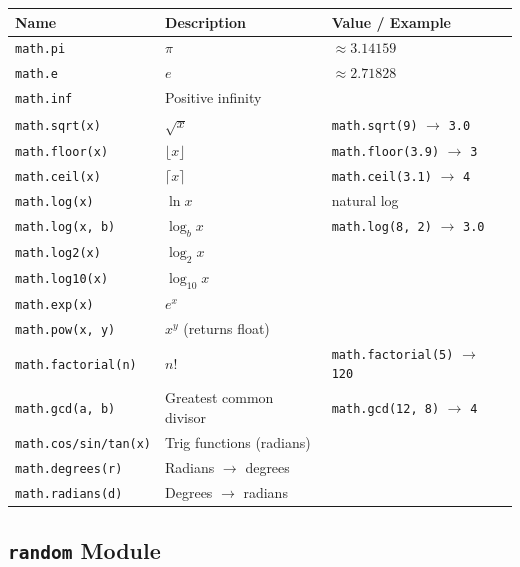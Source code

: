 \documentclass[oneside]{book}
\begin{document}
\begin{center}
\begin{tabular}{lll}
\toprule
\textbf{Name} & \textbf{Description} & \textbf{Value / Example} \\
\midrule
\texttt{math.pi}          & $\pi$                        & $\approx 3.14159$ \\
\texttt{math.e}           & $e$                          & $\approx 2.71828$ \\
\texttt{math.inf}         & Positive infinity            & \\
\texttt{math.sqrt(x)}     & $\sqrt{x}$                   & \texttt{math.sqrt(9)} $\to$ \texttt{3.0} \\
\texttt{math.floor(x)}    & $\lfloor x \rfloor$          & \texttt{math.floor(3.9)} $\to$ \texttt{3} \\
\texttt{math.ceil(x)}     & $\lceil x \rceil$            & \texttt{math.ceil(3.1)} $\to$ \texttt{4} \\
\texttt{math.log(x)}      & $\ln x$                      & natural log \\
\texttt{math.log(x, b)}   & $\log_b x$                   & \texttt{math.log(8, 2)} $\to$ \texttt{3.0} \\
\texttt{math.log2(x)}     & $\log_2 x$                   & \\
\texttt{math.log10(x)}    & $\log_{10} x$                & \\
\texttt{math.exp(x)}      & $e^x$                        & \\
\texttt{math.pow(x, y)}   & $x^y$ (returns float)        & \\
\texttt{math.factorial(n)} & $n!$                        & \texttt{math.factorial(5)} $\to$ \texttt{120} \\
\texttt{math.gcd(a, b)}   & Greatest common divisor      & \texttt{math.gcd(12, 8)} $\to$ \texttt{4} \\
\texttt{math.cos/sin/tan(x)} & Trig functions (radians)  & \\
\texttt{math.degrees(r)}  & Radians $\to$ degrees        & \\
\texttt{math.radians(d)}  & Degrees $\to$ radians        & \\
\bottomrule
\end{tabular}
\end{center}

\subsection*{\texttt{random} Module}
\end{document}
